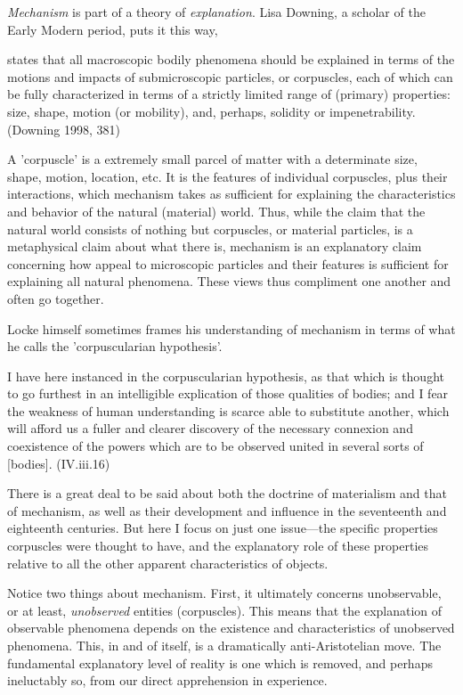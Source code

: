 \documentclass[12pt]{article}
\makeatletter
\newcommand{\citeprocitem}[2]{\hyper@linkstart{cite}{citeproc_bib_item_#1}#2\hyper@linkend}
\makeatother
\begin{document}
\emph{Mechanism} is part of a theory of \emph{explanation}. Lisa Downing, a
scholar of the Early Modern period, puts it this way,

\begin{quote-b}
 states that all macroscopic bodily phenomena
should be explained in terms of the motions and impacts of
submicroscopic particles, or corpuscles, each of which can be fully
characterized in terms of a strictly limited range of (primary)
properties: size, shape, motion (or mobility), and, perhaps, solidity
or impenetrability. (\citeprocitem{3}{Downing 1998, 381})
\end{quote-b}

A 'corpuscle' is a extremely small parcel of matter with a determinate size, shape,
motion, location, etc. It is the features of individual corpuscles, plus their
interactions, which mechanism takes as sufficient for explaining the characteristics
and behavior of the natural (material) world. Thus, while the claim that the natural
world consists of nothing but corpuscles, or material particles, is a metaphysical
claim about what there is, mechanism is an explanatory claim concerning how appeal to
microscopic particles and their features is sufficient for explaining all natural
phenomena. These views thus compliment one another and often go together.

Locke himself sometimes frames his understanding of mechanism in terms
of what he calls the 'corpuscularian hypothesis'.

\begin{quote-b}
I have here instanced in the corpuscularian hypothesis, as that which
is thought to go furthest in an intelligible explication of those
qualities of bodies; and I fear the weakness of human understanding is
scarce able to substitute another, which will afford us a fuller and
clearer discovery of the necessary connexion and coexistence of the
powers which are to be observed united in several sorts of [bodies].
(IV.iii.16)
\end{quote-b}

There is a great deal to be said about both the doctrine of materialism
and that of mechanism, as well as their development and influence in the
seventeenth and eighteenth centuries. But here I focus on just one
issue---the specific properties corpuscles were thought to have, and the
explanatory role of these properties relative to all the other apparent
characteristics of objects.

Notice two things about mechanism. First, it ultimately concerns
unobservable, or at least, \emph{unobserved} entities (corpuscles). This
means that the explanation of observable phenomena depends on the
existence and characteristics of unobserved phenomena. This, in and of
itself, is a dramatically anti-Aristotelian move. The fundamental
explanatory level of reality is one which is removed, and perhaps
ineluctably so, from our direct apprehension in experience.
\end{document}
